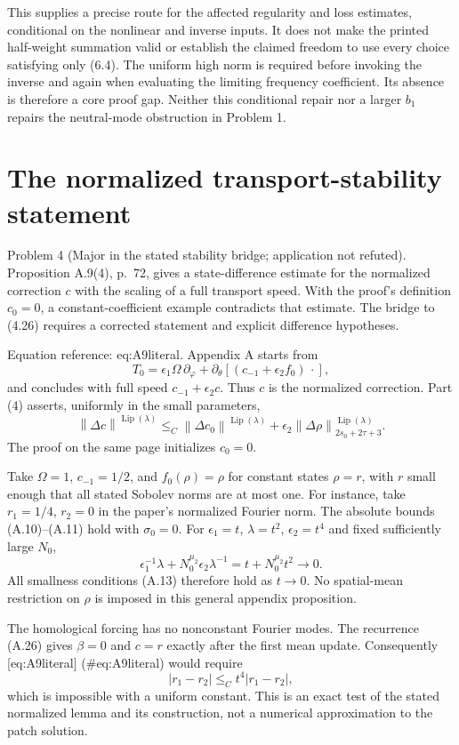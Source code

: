 \documentclass[10pt]{article}
\begin{document}
This supplies a precise route for the affected regularity and loss estimates, conditional on the nonlinear and inverse inputs. It does not make the printed half-weight summation valid or establish the claimed freedom to use every choice satisfying only (6.4). The uniform high norm is required before invoking the inverse and again when evaluating the limiting frequency coefficient. Its absence is therefore a core proof gap. Neither this conditional repair nor a larger \(b_1\) repairs the neutral-mode obstruction in Problem 1.\par
\section*{The normalized transport-stability statement}
Problem 4 (Major in the stated stability bridge; application not refuted).  Proposition A.9(4), p. 72, gives a state-difference estimate for the normalized correction \(c\) with the scaling of a full transport speed. With the proof’s definition \(c_0=0\), a constant-coefficient example contradicts that estimate. The bridge to (4.26) requires a corrected statement and explicit difference hypotheses.\par
Equation reference: eq:A9literal. Appendix A starts from \[T_0=\epsilon_1\Omega\,\partial_\varphi+
       \partial_\theta[(c_{-1}+\epsilon_2f_0)\,\cdot],\] and concludes with full speed \(c_{-1}+\epsilon_2c\). Thus \(c\) is the normalized correction. Part (4) asserts, uniformly in the small parameters, \[
 \left\lVert \Delta c\right\rVert^{\operatorname{Lip}(\lambda)}
 \mathrel{\leq_C}\left\lVert \Delta c_0\right\rVert^{\operatorname{Lip}(\lambda)}
       +\epsilon_2\left\lVert \Delta\rho\right\rVert_{2s_0+2\tau+3}^{\operatorname{Lip}(\lambda)} .\] The proof on the same page initializes \(c_0=0\).\par
Take \(\Omega=1\), \(c_{-1}=1/2\), and \(f_0(\rho)=\rho\) for constant states \(\rho=r\), with \(r\) small enough that all stated Sobolev norms are at most one. For instance, take \(r_1=1/4\), \(r_2=0\) in the paper’s normalized Fourier norm. The absolute bounds (A.10)–(A.11) hold with \(\sigma_0=0\). For \(\epsilon_1=t\), \(\lambda=t^2\), \(\epsilon_2=t^4\) and fixed sufficiently large \(N_0\), \[\epsilon_1^{-1}\lambda+
       N_0^{\mu_2}\epsilon_2\lambda^{-1}
        =t+N_0^{\mu_2}t^2\longrightarrow0 .\] All smallness conditions (A.13) therefore hold as \(t\to0\). No spatial-mean restriction on \(\rho\) is imposed in this general appendix proposition.\par
The homological forcing has no nonconstant Fourier modes. The recurrence (A.26) gives \(\beta=0\) and \(c=r\) exactly after the first mean update. Consequently [eq:A9literal] (\#eq:A9literal) would require \[|r_1-r_2|\mathrel{\leq_C}t^4|r_1-r_2|,\] which is impossible with a uniform constant. This is an exact test of the stated normalized lemma and its construction, not a numerical approximation to the patch solution.\par
\end{document}
